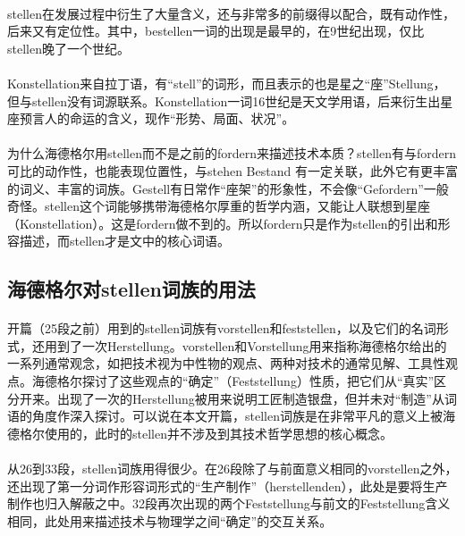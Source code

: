\documentclass{article}
\begin{document}
		\paragraph{}
		stellen在发展过程中衍生了大量含义，还与非常多的前缀得以配合，既有动作性，后来又有定位性。其中，bestellen一词的出现是最早的，在9世纪出现，仅比stellen晚了一个世纪。
		\paragraph{}
		Konstellation来自拉丁语，有“stell”的词形，而且表示的也是星之“座”Stellung，但与stellen没有词源联系。Konstellation一词16世纪是天文学用语，后来衍生出星座预言人的命运的含义，现作“形势、局面、状况”。
		\paragraph{}
		为什么海德格尔用stellen而不是之前的fordern来描述技术本质？stellen有与fordern可比的动作性，也能表现位置性，与stehen Bestand 有一定关联，此外它有更丰富的词义、丰富的词族。Gestell有日常作“座架”的形象性，不会像“Gefordern”一般奇怪。stellen这个词能够携带海德格尔厚重的哲学内涵，又能让人联想到星座（Konstellation）。这是fordern做不到的。所以fordern只是作为stellen的引出和形容描述，而stellen才是文中的核心词语。
	\subsection{海德格尔对stellen词族的用法}
		\paragraph{}
		开篇（25段之前）用到的stellen词族有vorstellen和feststellen，以及它们的名词形式，还用到了一次Herstellung。vorstellen和Vorstellung用来指称海德格尔给出的一系列通常观念，如把技术视为中性物的观点、两种对技术的通常见解、工具性观点。海德格尔探讨了这些观点的“确定”（Feststellung）性质，把它们从“真实”区分开来。出现了一次的Herstellung被用来说明工匠制造银盘，但并未对“制造”从词语的角度作深入探讨。可以说在本文开篇，stellen词族是在非常平凡的意义上被海德格尔使用的，此时的stellen并不涉及到其技术哲学思想的核心概念。
		\paragraph{}
		从26到33段，stellen词族用得很少。在26段除了与前面意义相同的vorstellen之外，还出现了第一分词作形容词形式的“生产制作”（herstellenden），此处是要将生产制作也归入解蔽之中。32段再次出现的两个Feststellung与前文的Feststellung含义相同，此处用来描述技术与物理学之间“确定”的交互关系。
\end{document}
